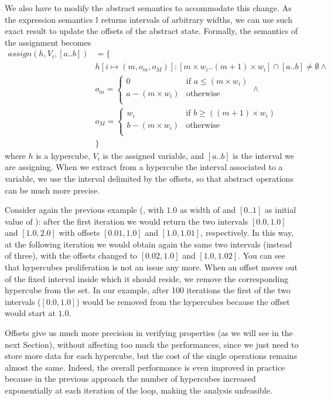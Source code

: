 We also have to modify the abstract semantics to accommodate this change. As the expression semantics $\mathbb{I}$ returns intervals of arbitrary widths, we can use such exact result to update the offsets of the abstract state. Formally, the semantics of the assignment becomes 
\begin{align*}
assign(h, V_i, [a..b]) & = \{ \\
& h[i\mapsto (m,o_m,o_M)] : [m\times w_i .. (m+1)\times w_i] \cap [a..b] \neq \emptyset \wedge \\
& o_m = \begin{cases} 
0 & \mbox{if } a \leq (m \times w_i) \\
a - (m \times w_i) & \mbox{otherwise} \\
\end{cases} \wedge \\
& o_M = \begin{cases} 
w_i & \mbox{if } b \geq ((m+1) \times w_i) \\
b - (m \times w_i) & \mbox{otherwise} \\
\end{cases} \\
& \}
\end{align*}
where $h$ is a hypercube, $V_i$ is the assigned variable, and $[a..b]$ is the interval we are assigning. When we extract from a hypercube the interval associated to a variable, we use the interval delimited by the offsets, so that abstract operations can be much more precise. 

Consider again the previous example (, with $1.0$ as width of  and $[0..1]$ as initial value of ): after the first iteration we would return the two intervals $[0.0,1.0]$ and $[1.0,2.0]$ with offsets $[0.01,1.0]$ and $[1.0,1.01]$, respectively. In this way, at the following iteration we would obtain again the same two intervals (instead of three), with the offsets changed to $[0.02,1.0]$ and $[1.0,1.02]$. You can see that hypercubes proliferation is not an issue any more. When an offset moves out of the fixed interval inside which it should reside, we remove the corresponding hypercube from the set. In our example, after 100 iterations the first of the two intervals ($[0.0,1.0]$) would be removed from the hypercubes because the offset would start at $1.0$.

Offsets give us much more precision in verifying properties (as we will see in the next Section), without affecting too much the performances, since we just need to store more data for each hypercube, but the cost of the single operations remains almost the same. Indeed, the overall performance is even improved in practice because in the previous approach the number of hypercubes increased exponentially at each iteration of the  loop, making the analysis unfeasible.

